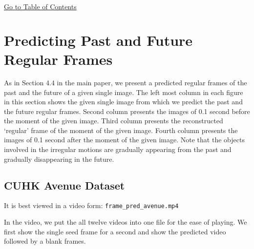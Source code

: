 \documentclass[10pt,twocolumn,letterpaper]{article}
\begin{document}
\begin{center}
	\hyperlink{page.11}{Go to Table of Contents}
\end{center}

\clearpage 

\section{Predicting Past and Future Regular Frames}
\label{sec:frame_pred}
As in Section 4.4 in the main paper, we present a predicted regular frames of the past and the future of a given single image. 
The left most column in each figure in this section shows the given single image from which we predict the past and the future regular frames. 
Second column presents the images of 0.1 second before the moment of the given image. 
Third column presents the reconstructed `regular' frame of the moment of the given image.
Fourth column presents the images of 0.1 second after the moment of the given image.
Note that the objects involved in the irregular motions are gradually appearing from the past and gradually disappearing in the future.



\subsection{CUHK Avenue Dataset}
\label{sec:frame_pred_avenue}
It is best viewed in a video form: \texttt{frame\_pred\_avenue.mp4}

In the video, we put the all twelve videos into one file for the ease of playing. 
We first show the single seed frame for a second and show the predicted video followed by a blank frames.
\end{document}
